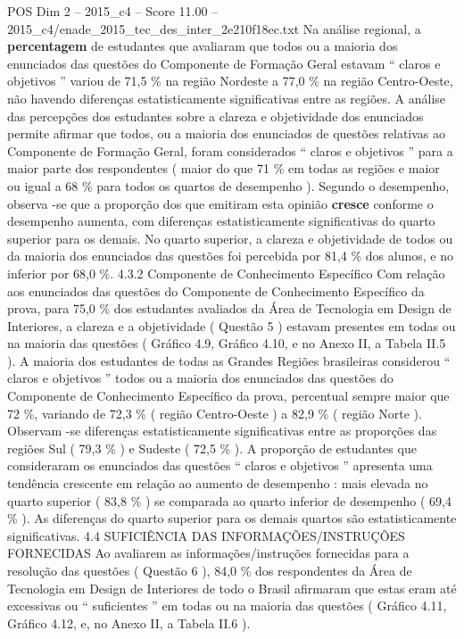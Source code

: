 \begin{textsample}{POS Dim 2 – 2015\_c4 – Score 11.00 – 2015\_c4/enade\_2015\_tec\_des\_inter\_2e210f18ec.txt}
Na análise regional, a \textbf{percentagem} de estudantes que avaliaram que todos ou a maioria dos enunciados das questões do Componente de Formação Geral estavam “ claros e objetivos ” variou de 71,5 \% na região Nordeste a 77,0 \% na região Centro-Oeste, não havendo diferenças estatisticamente significativas entre as regiões.
A análise das percepções dos estudantes sobre a clareza e objetividade dos enunciados permite afirmar que todos, ou a maioria dos enunciados de questões relativas ao Componente de Formação Geral, foram considerados “ claros e objetivos ” para a maior parte dos respondentes ( maior do que 71 \% em todas as regiões e maior ou igual a 68 \% para todos os quartos de desempenho ).
Segundo o desempenho, observa -se que a proporção dos que emitiram esta opinião \textbf{cresce} conforme o desempenho aumenta, com diferenças estatisticamente significativas do quarto superior para os demais.
No quarto superior, a clareza e objetividade de todos ou da maioria dos enunciados das questões foi percebida por 81,4 \% dos alunos, e no inferior por 68,0 \%. 4.3.2 Componente de Conhecimento Específico Com relação aos enunciados das questões do Componente de Conhecimento Específico da prova, para 75,0 \% dos estudantes avaliados da Área de Tecnologia em Design de Interiores, a clareza e a objetividade ( Questão 5 ) estavam presentes em todas ou na maioria das questões ( Gráfico 4.9, Gráfico 4.10, e no Anexo II, a Tabela II.5 ).
A maioria dos estudantes de todas as Grandes Regiões brasileiras considerou “ claros e objetivos ” todos ou a maioria dos enunciados das questões do Componente de Conhecimento Específico da prova, percentual sempre maior que 72 \%, variando de 72,3 \% ( região Centro-Oeste ) a 82,9 \% ( região Norte ).
Observam -se diferenças estatisticamente significativas entre as proporções das regiões Sul ( 79,3 \% ) e Sudeste ( 72,5 \% ).
A proporção de estudantes que consideraram os enunciados das questões “ claros e objetivos ” apresenta uma tendência crescente em relação ao aumento de desempenho : mais elevada no quarto superior ( 83,8 \% ) se comparada ao quarto inferior de desempenho ( 69,4 \% ).
As diferenças do quarto superior para os demais quartos são estatisticamente significativas. 4.4 SUFICIÊNCIA DAS INFORMAÇÕES/INSTRUÇÕES FORNECIDAS Ao avaliarem as informações/instruções fornecidas para a resolução das questões ( Questão 6 ), 84,0 \% dos respondentes da Área de Tecnologia em Design de Interiores de todo o Brasil afirmaram que estas eram até excessivas ou “ suficientes ” em todas ou na maioria das questões ( Gráfico 4.11, Gráfico 4.12, e, no Anexo II, a Tabela II.6 ).

\end{textsample}
